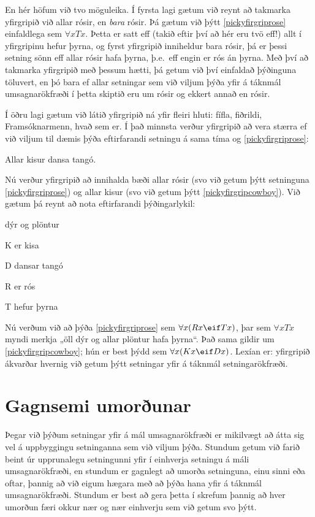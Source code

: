 En hér höfum við tvo möguleika. Í fyrsta lagi gætum við reynt að takmarka yfirgripið við allar rósir, en \emph{bara} rósir. Þá gætum við þýtt \ref{pickyfirgriprose} einfaldlega sem $\forall x Tx$. Þetta er satt eff (takið eftir því að hér eru tvö eff!) allt í yfirgripinu hefur þyrna, og fyrst yfirgripið inniheldur bara rósir, þá er þessi setning sönn eff allar rósir hafa þyrna, þ.e.\ eff engin er rós án þyrna. Með því að takmarka yfirgripið með þessum hætti, þá getum við því einfaldað þýðinguna töluvert, en þó bara ef allar setningar sem við viljum þýða yfir á táknmál umsagnarökfræði í þetta skiptið eru um rósir og ekkert annað en rósir.

Í öðru lagi gætum við látið yfirgripið ná yfir fleiri hluti: fífla, fiðrildi, Framsóknarmenn, hvað sem er. Í það minnsta verður yfirgripið að vera stærra ef við viljum til dæmis þýða eftirfarandi setningu á sama tíma og \ref{pickyfirgriprose}:

	\begin{earg}
		\item[\ex{pickyfirgripcowboy}] Allar kisur dansa tangó.
	\end{earg}
Nú verður yfirgripið að innihalda bæði allar rósir (svo við getum þýtt setninguna \ref{pickyfirgriprose}) og allar kisur (svo við getum þýtt \ref{pickyfirgripcowboy}). Við gætum þá reynt að nota eftirfarandi þýðingarlykil:
	\begin{ekey}
		\item[\text{yfirgrip}] dýr og plöntur
		\item[K]  er kisa
		\item[D]  dansar tangó
		\item[R]  er rós
		\item[T]  hefur þyrna
	\end{ekey}
Nú verðum við að þýða \ref{pickyfirgriprose} sem $\forall x (Rx \eif Tx)$, þar sem $\forall x Tx$ myndi merkja „öll dýr og allar plöntur hafa þyrna“. Það sama gildir um \ref{pickyfirgripcowboy}; hún er best þýdd sem $\forall x (Kx \eif Dx)$. Lexían er: yfirgripið ákvarðar hvernig við getum þýtt setningar yfir á táknmál setningarökfræði.

\section{Gagnsemi umorðunar}

Þegar við þýðum setningar yfir á mál umsagnarökfræði er mikilvægt að átta sig vel á uppbyggingu setninganna sem við viljum þýða. Stundum getum við farið beint úr upprunalegu setningunni yfir í einhverja setningu á máli umsagnarökfræði, en stundum er gagnlegt að umorða setninguna, einu sinni eða oftar, þannig að við eigum hægara með að þýða hana yfir á táknmál umsagnarökfræði. Stundum er best að gera þetta í skrefum þannig að hver umorðun færi okkur nær og nær einhverju sem við 
getum svo þýtt.

